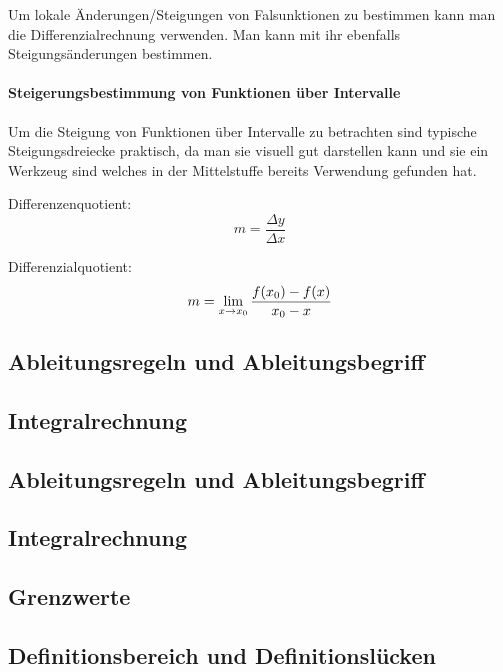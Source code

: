 \documentclass{article}
\begin{document}
			Um lokale Änderungen/Steigungen von Falsunktionen zu bestimmen kann man die Differenzialrechnung verwenden.
			Man kann mit ihr ebenfalls Steigungsänderungen bestimmen.
		\paragraph{Steigerungsbestimmung von Funktionen über Intervalle}
			
			Um die Steigung von Funktionen über Intervalle zu betrachten sind typische Steigungsdreiecke praktisch,
			da man sie visuell gut darstellen kann und sie ein Werkzeug sind welches in der Mittelstuffe bereits
			Verwendung gefunden hat.
			
			Differenzenquotient:
			\[
			    m = {\frac {\Delta y} {\Delta x}}
			\]
			
			Differenzialquotient:
			\[
			    m = \lim_{x \to x_{0}} {{f(x_{0}) - f(x)} \over { x_{0} - x}}
			\]




		\paragraph{}

	\subsection{Ableitungsregeln und Ableitungsbegriff}\label{Ableitungen}
	
	\subsection{Integralrechnung}\label{Integralrechnung}
	\subsection{Ableitungsregeln und Ableitungsbegriff}\label{Ableitungen}
	\subsection{Integralrechnung}\label{Integralrechnung}
	
	\subsection{Grenzwerte}
	\subsection{Definitionsbereich und Definitionslücken}\label{Definitionsbereich}
\end{document}
